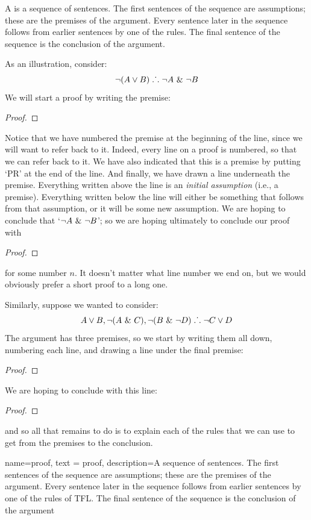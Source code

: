 A  is a sequence of sentences. The first sentences of the sequence are assumptions; these are the premises of the argument. Every sentence later in the sequence follows from earlier sentences by one of the rules. The final sentence of the sequence is the conclusion of the argument.

As an illustration, consider:
	$${\neg} (A \vee B) \mathrel{\ldotp\dot{}\,\ldotp} {\neg} A ~\&~ {\neg} B$$
We will start a proof by writing the premise:
\begin{proof}
	 
\end{proof}
Notice that we have numbered the premise at the beginning of the line, since we will want to refer back to it. Indeed, every line on a proof is numbered, so that we can refer back to it. We have also indicated that this is a premise by putting `PR' at the end of the line. And finally, we have drawn a line underneath the premise. Everything written above the line is an \emph{initial assumption} (i.e., a premise). Everything written below the line will either be something that follows from that assumption, or it will be some new assumption. We are hoping to conclude that `${\neg} A ~\&~ {\neg} B$'; so we are hoping ultimately to conclude our proof with
\begin{proof}
\end{proof}
for some number $n$. It doesn't matter what line number we end on, but we would obviously prefer a short proof to a long one.

Similarly, suppose we wanted to consider:
$$A\vee B, {\neg} (A~\&~ C), {\neg} (B ~\&~ {\neg} D) \mathrel{\ldotp\dot{}\,\ldotp} {\neg} C\vee D$$
The argument has three premises, so we start by writing them all down, numbering each line, and drawing a line under the final premise:
\begin{proof}
	 
	 
	 
\end{proof}
We are hoping to conclude with this line:
\begin{proof}
\end{proof}
and so all that remains to do is to explain each of the rules that we can use to get from the premises to the conclusion. 

{
  name=proof,
  text = proof,
description={A sequence of sentences. The first sentences of the sequence are assumptions; these are the premises of the argument. Every sentence later in the sequence follows from earlier sentences by one of the rules of TFL. The final sentence of the sequence is the conclusion of the argument}
}


